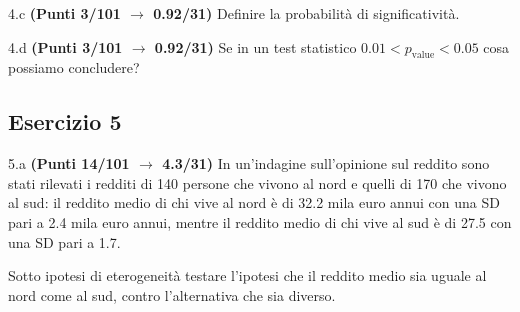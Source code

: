 \documentclass[
  11pt,
]{book}
\theoremstyle{mytheoremstyle}
\theoremstyle{mydefstyle}
\begin{document}
4.c \textbf{(Punti 3/101 \(\rightarrow\) 0.92/31)} Definire la probabilità di significatività.

4.d \textbf{(Punti 3/101 \(\rightarrow\) 0.92/31)} Se in un test statistico \(0.01 < p_\text{value} <0.05\) cosa possiamo concludere?

\subsection{Esercizio 5}\label{esercizio-5-10}

5.a \textbf{(Punti 14/101 \(\rightarrow\) 4.3/31)} In un'indagine sull'opinione sul reddito sono stati rilevati i redditi di 140 persone che vivono al nord e quelli di 170 che vivono al sud: il reddito medio di chi vive al nord è di 32.2 mila euro annui con una SD pari a 2.4 mila euro annui, mentre il
reddito medio di chi vive al sud è di 27.5 con una SD pari a 1.7.

Sotto ipotesi di eterogeneità testare l'ipotesi che il reddito medio sia uguale al nord come al sud, contro l'alternativa che sia diverso.
\end{document}
